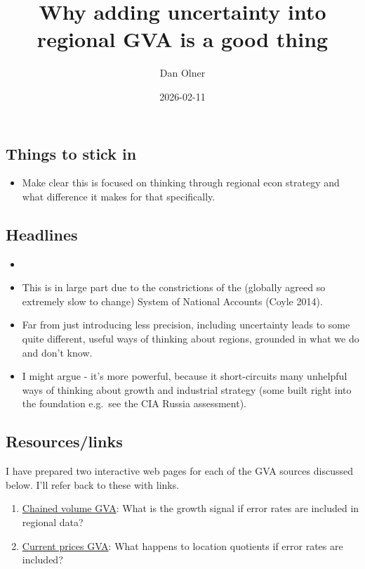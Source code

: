\documentclass[
  letterpaper,
  DIV=11,
  numbers=noendperiod]{scrartcl}
\title{Why adding uncertainty into regional GVA is a good thing}
\author{Dan Olner}
\date{2026-02-11}
\providecommand{\tightlist}{%
  \setlength{\itemsep}{0pt}\setlength{\parskip}{0pt}}
\renewcommand*\contentsname{Table of contents}
\newcommand\contentsname{Table of contents}
\begin{document}
\maketitle

\renewcommand*\contentsname{Table of contents}
{
\hypersetup{linkcolor=}
\setcounter{tocdepth}{3}
\tableofcontents
}

\subsection{Things to stick in}\label{things-to-stick-in}

\begin{itemize}
\tightlist
\item
  Make clear this is focused on thinking through regional econ strategy
  and what difference it makes for that specifically.
\end{itemize}

\subsection{Headlines}\label{headlines}

\begin{itemize}
\item
\item
  This is in large part due to the constrictions of the (globally agreed
  so extremely slow to change) System of National Accounts (Coyle 2014).
\item
  Far from just introducing less precision, including uncertainty leads
  to some quite different, useful ways of thinking about regions,
  grounded in what we do and don't know.
\item
  I might argue - it's more powerful, because it short-circuits many
  unhelpful ways of thinking about growth and industrial strategy (some
  built right into the foundation e.g.~see the CIA Russia assessment).
\end{itemize}

\subsection{Resources/links}\label{resourceslinks}

I have prepared two interactive web pages for each of the GVA sources
discussed below. I'll refer back to these with links.

\begin{enumerate}
\def\labelenumi{\arabic{enumi}.}
\item
  \href{https://danolner.github.io/RegEconWorks/growth_errorgrids_viewer/}{Chained
  volume GVA}: What is the growth signal if error rates are included in
  regional data?
\item
  \href{https://danolner.github.io/RegEconWorks/lq-errorbars-viewer/}{Current
  prices GVA}: What happens to location quotients if error rates are
  included?
\end{enumerate}
\end{document}
